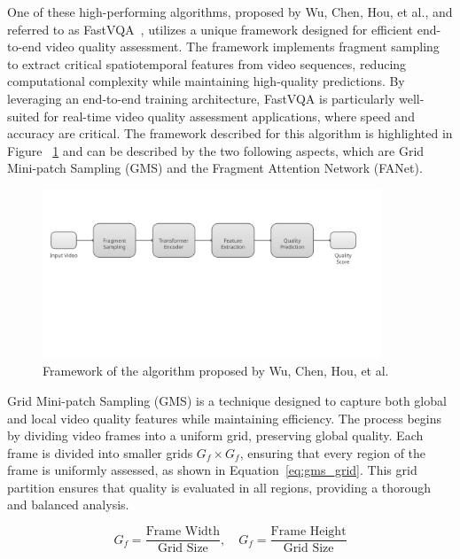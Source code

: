 One of these high-performing algorithms, proposed by Wu, Chen, Hou, et al., and referred to as FastVQA~\cite{wu2022fastvqa}, utilizes a unique framework designed for efficient end-to-end video quality assessment. The framework implements fragment sampling to extract critical spatiotemporal features from video sequences, reducing computational complexity while maintaining high-quality predictions. By leveraging an end-to-end training architecture, FastVQA is particularly well-suited for real-time video quality assessment applications, where speed and accuracy are critical. The framework described for this algorithm is highlighted in Figure ~\ref{fig:framework1} and can be described by the two following aspects, which are Grid Mini-patch Sampling (GMS) and the Fragment Attention Network (FANet).

\begin{figure}
    \centering
    \includegraphics[width=0.9\textwidth]{figures/fast-vqa-framework-3.png}
    \caption{Framework of the algorithm proposed by Wu, Chen, Hou, et al.~\cite{wu2022fastvqa}}
    \label{fig:framework1}
\end{figure}

Grid Mini-patch Sampling (GMS) is a technique designed to capture both global and local video quality features while maintaining efficiency. The process begins by dividing video frames into a uniform grid, preserving global quality. Each frame is divided into smaller grids \(G_f \times G_f\), ensuring that every region of the frame is uniformly assessed, as shown in Equation~\ref{eq:gms_grid}. This grid partition ensures that quality is evaluated in all regions, providing a thorough and balanced analysis.

\begin{equation}
G_f = \frac{\text{Frame Width}}{\text{Grid Size}}, \quad G_f = \frac{\text{Frame Height}}{\text{Grid Size}}
\label{eq:gms_grid}
\end{equation}

